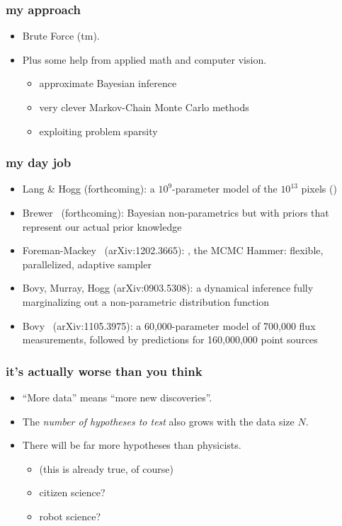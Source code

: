 \documentclass[pdftex]{beamer}
\begin{document}
\begin{frame}
  \frametitle{my approach}
  \begin{itemize}
  \item<1-> Brute Force (tm).
  \item<2-> Plus some help from applied math and computer vision.
    \begin{itemize}
    \item approximate Bayesian inference
    \item very clever Markov-Chain Monte Carlo methods
    \item exploiting problem sparsity
    \end{itemize}
  \end{itemize}
\end{frame}

\begin{frame}
  \frametitle{my day job}
  \begin{itemize}
  \item Lang \& Hogg {\small(forthcoming)}: a $10^9$-parameter model of the
    $10^{13}$  pixels ()
  \item Brewer \etal\ {\small(forthcoming)}: Bayesian non-parametrics but with
    priors that represent our actual prior knowledge
  \item Foreman-Mackey \etal\ {\small(arXiv:1202.3665)}:
    , the MCMC Hammer: flexible, parallelized, adaptive
    sampler
  \item Bovy, Murray, Hogg {\small(arXiv:0903.5308)}: a dynamical inference
    fully marginalizing out a non-parametric distribution function
  \item Bovy \etal\ {\small(arXiv:1105.3975)}: a 60,000-parameter model of
    700,000 flux measurements, followed by predictions for 160,000,000
    point sources
  \end{itemize}
\end{frame}

\begin{frame}
  \frametitle{it's actually worse than you think}
  \begin{itemize}
  \item ``More data'' means ``more new discoveries''.
  \item The \emph{number of hypotheses to test} also grows with the data size $N$.
  \item There will be far more hypotheses than physicists.
    \begin{itemize}
    \item (this is already true, of course)
    \item citizen science?
    \item robot science?
    \end{itemize}
  \end{itemize}
\end{frame}
\end{document}
